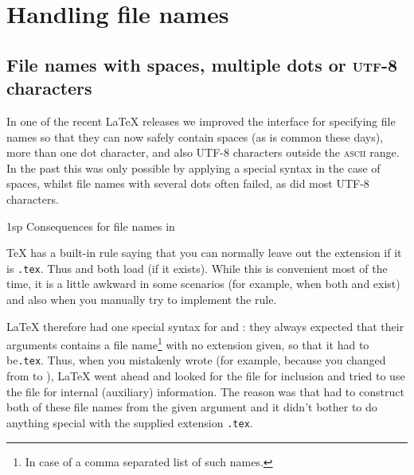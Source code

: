 \documentclass{ltnews}
\makeatletter
\renewcommand{\subsubsection}{%
   \@startsection
      {subsubsection}{2}{\leftmargini}{-1.5ex \@plus -1ex \@minus -.2ex}%
      {1sp}{\@subheadingfont}%
}
\providecommand\acro[1]{\textsc{#1}}
\makeatother
\begin{document}
\section{Handling file names}



\subsection[File names with spaces, multiple dots or\\
            \acro{utf-8} characters]
           {File names with spaces, multiple dots or \acro{utf-8} characters}

In one of the recent \LaTeX{} releases we improved the interface
for specifying file names so that they can now safely contain spaces
(as is common these days),
more than one dot character, and also UTF-8 characters
outside the \acro{ascii} range. 
In the past this was only possible by applying a special syntax
in the case of spaces, 
whilst file names with several dots often failed, 
as did most UTF-8 characters.


\subsubsection{Consequences for file names in }

\TeX{} has a built-in rule saying that you can normally leave out the
extension if it is \texttt{.tex}.  Thus \verb== and
\verb== both load  (if it exists).
While this is convenient most of the time, it is a little awkward in
some scenarios (for example, when both  and 
exist) and also when you manually try to implement the rule.

\LaTeX{} therefore had one special syntax for  and
: they always expected that 
their arguments contains a
file name\footnote{In case of  a comma separated list of such names.} 
with no extension given,
  so that it had to be\texttt{.tex}.  Thus,
 when you mistakenly wrote
\verb== (for example,
because you changed from 
to ),
\LaTeX{} went ahead and looked for the
file  for inclusion and tried to
use the file  for internal (auxiliary) information.  The reason was that
 had to construct both
of these file names from the given
argument and it didn't bother to do
anything special
with the supplied 
extension \texttt{.tex}.
\end{document}
